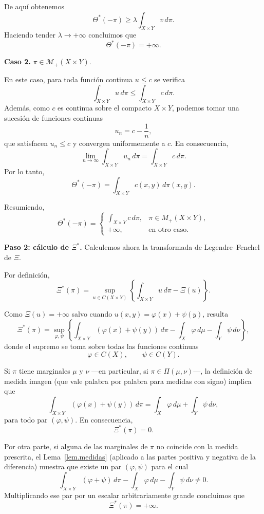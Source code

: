 \documentclass[12pt, a4paper]{amsbook}
\theoremstyle{remark}
\theoremstyle{definition}
\numberwithin{section}{chapter}
\numberwithin{subsection}{section}
\numberwithin{equation}{section}
\numberwithin{figure}{chapter}
\begin{document}
De aquí obtenemos
\[
\Theta^*(-\pi)
\ge
\lambda
\int_{X\times Y}v\,d\pi.
\]
Haciendo tender $\lambda\to+\infty$ concluimos que
\[
\Theta^*(-\pi)=+\infty.
\]

\medskip

\noindent
\textbf{Caso 2.} $\pi\in \mathcal M_+(X\times Y)$.

En este caso, para toda función continua $u\le c$ se verifica
\[
\int_{X\times Y}u\,d\pi
\le
\int_{X\times Y}c\,d\pi.
\]
Además, como $c$ es continua sobre el compacto $X\times Y$, podemos tomar
una sucesión de funciones continuas
\[
u_n=c-\frac1n,
\]
que satisfacen $u_n\le c$ y convergen uniformemente a $c$. En consecuencia,
\[
\lim_{n\to\infty}
\int_{X\times Y}u_n\,d\pi
=
\int_{X\times Y}c\,d\pi.
\]
Por lo tanto,
\[
\Theta^*(-\pi)
=
\int_{X\times Y}c(x,y)\,d\pi(x,y).
\]

Resumiendo,
\[
\Theta^*(-\pi)
=
\begin{cases}
\displaystyle
\int_{X\times Y}c\,d\pi,
&
\pi\in M_+(X\times Y),
\\[2ex]
+\infty,
&
\text{en otro caso}.
\end{cases}
\]

\medskip\noindent\textbf{Paso 2: cálculo de $\Xi^*$.}
Calculemos ahora la transformada de Legendre--Fenchel de $\Xi$.

Por definición,
\[
\Xi^*(\pi)
=
\sup_{u\in C(X\times Y)}
\left\{
\int_{X\times Y}u\,d\pi
-
\Xi(u)
\right\}.
\]

Como $\Xi(u)=+\infty$ salvo cuando
$u(x,y)=\varphi(x)+\psi(y)$, resulta
\[
\Xi^*(\pi)
=
\sup_{\varphi,\psi}
\left\{
\int_{X\times Y}
(\varphi(x)+\psi(y))
\,d\pi
-
\int_X\varphi\,d\mu
-
\int_Y\psi\,d\nu
\right\},
\]
donde el supremo se toma sobre todas las funciones continuas
\[
\varphi\in C(X),
\qquad
\psi\in C(Y).
\]

Si $\pi$ tiene marginales $\mu$ y $\nu$ —en particular, si
$\pi\in\Pi(\mu,\nu)$—, la definición de medida imagen (que vale palabra por
palabra para medidas con signo) implica que
\[
\int_{X\times Y}
(\varphi(x)+\psi(y))
\,d\pi
=
\int_X\varphi\,d\mu
+
\int_Y\psi\,d\nu,
\]
para todo par $(\varphi,\psi)$. En consecuencia,
\[
\Xi^*(\pi)=0.
\]

Por otra parte, si alguna de las marginales de $\pi$ no coincide con la
medida prescrita, el Lema~\ref{lem.medidas} (aplicado a las partes positiva
y negativa de la diferencia) muestra que existe un par
$(\varphi,\psi)$ para el cual
\[
\int_{X\times Y}
(\varphi+\psi)\,d\pi
-
\int_X\varphi\,d\mu
-
\int_Y\psi\,d\nu
\neq0.
\]
Multiplicando ese par por un escalar arbitrariamente grande concluimos que
\[
\Xi^*(\pi)=+\infty.
\]
\end{document}
